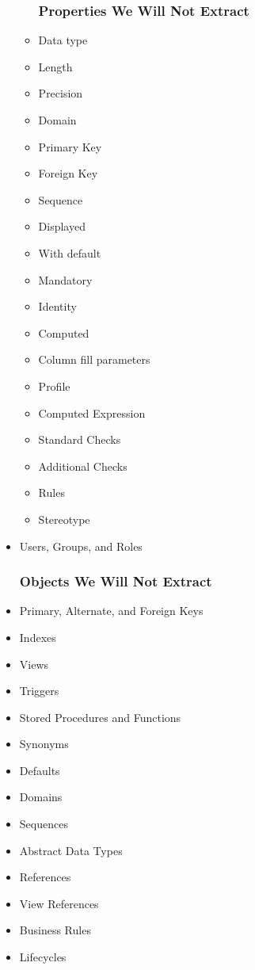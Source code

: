 \documentclass[12pt,a4paper]{report}
\let\openright=\clearpage
\begin{document}
\begin{itemize}
\begin{itemize}
		\subsubsection{Properties We Will Not Extract}
		\item Data type 
		\item Length 
		\item Precision
		\item Domain
		\item Primary Key
		\item Foreign Key
		\item Sequence
		\item Displayed
		\item With default
		\item Mandatory
		\item Identity
		\item Computed
		\item Column fill parameters
		\item Profile 
		\item Computed Expression
		\item Standard Checks
		\item Additional Checks
		\item Rules
		\item Stereotype
	\end{itemize}
	\item Users, Groups, and Roles
	\subsubsection{Objects We Will Not Extract}
	\item Primary, Alternate, and Foreign Keys 
	\item Indexes
	\item Views
	\item Triggers
	\item Stored Procedures and Functions
	\item Synonyms 
	\item Defaults
	\item Domains
	\item Sequences 
	\item Abstract Data Types
	\item References
	\item View References
	\item Business Rules
	\item Lifecycles
\end{itemize}

\openright
\end{document}
